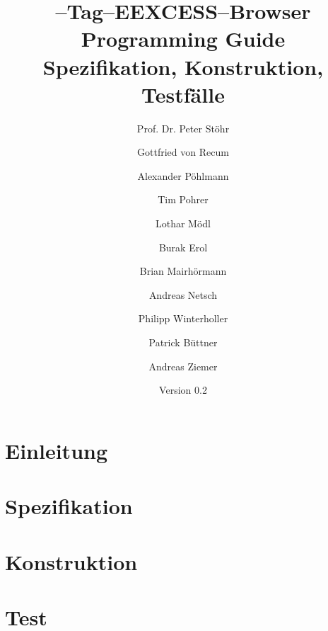 \documentclass[
    DIV12,
    cleardouble=plain,
    headings=normal,
    pdftex,
    headexclude,footexclude,
    final
]{scrreprt}
\title{
  \SECH--Tag--EEXCESS--Browser \\[1em]
  Programming Guide\\
Spezifikation, Konstruktion, Testfälle
}
\author{Prof. Dr. Peter Stöhr \and Gottfried von Recum \and Alexander Pöhlmann \and Tim Pohrer \and Lothar Mödl \and Burak Erol \and Brian Mairhörmann \and Andreas Netsch \and Philipp Winterholler \and Patrick Büttner \and Andreas Ziemer}
\date{Version 0.2}
\begin{document}
\maketitle
{}
\tableofcontents

\newpage
{}

\part{Einleitung}





\part{Spezifikation}





\part{Konstruktion}
















\part{Test}


\newpage
\listoffigures
\listoftables
\end{document}
